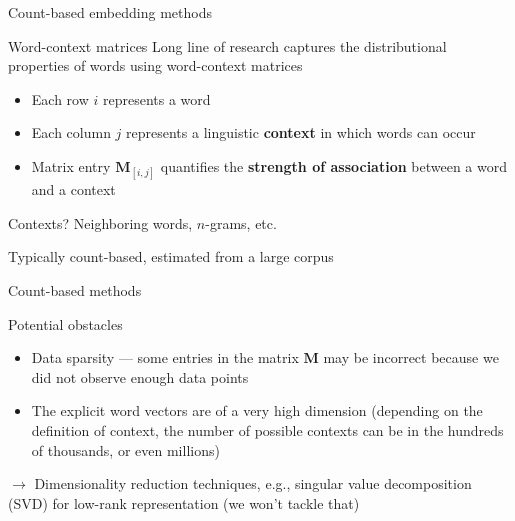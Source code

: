 \documentclass[12pt,aspectratio=169,handout]{beamer}
\begin{document}
\begin{frame}{Count-based embedding methods}

\begin{block}{Word-context matrices}
Long line of research captures the distributional properties of words using word-context matrices
\begin{itemize}
	\item Each row $i$ represents a word
	\item Each column $j$ represents a linguistic \textbf{context} in which words can occur
	\item Matrix entry $\bm{M}_{[i, j]}$ quantifies the \textbf{strength of association} between
	a word and a context
\end{itemize}
\end{block}
Contexts? Neighboring words, $n$-grams, etc.

Typically count-based, estimated from a large corpus

\end{frame}

\begin{frame}{Count-based methods}

Potential obstacles

\begin{itemize}
	\item Data sparsity --- some entries in the matrix $\bm{M}$ may be incorrect because we did not observe enough data points
	\item The explicit word vectors are of a very high dimension (depending on the definition of context, the number of possible contexts can be in the hundreds of thousands, or even millions)
\end{itemize}

$\to$ Dimensionality reduction techniques, e.g., singular value decomposition (SVD) for low-rank representation (we won't tackle that)
\end{frame}
\end{document}
